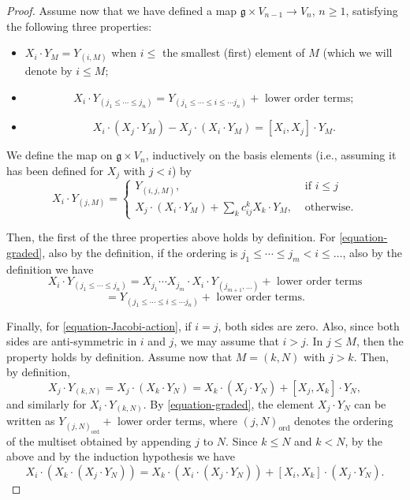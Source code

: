 \begin{proof}
Assume now that we have defined a map $\mathfrak g \times V_{n-1}\to V_n$, $n\ge 1$, satisfying the following three properties:
\begin{itemize}
 \item $X_i\cdot Y_M = Y_{(i,M)}$ when $i \le $ the smallest (first) element of $M$ (which we will denote by $i\le M$;
 \item 
\begin{equation}
\label{equation-graded} X_i\cdot Y_{(j_1\le \cdots \le j_n)} = Y_{(j_1\le \cdots\le i\le\cdots j_n)}+\mbox{ lower order terms};
 \end{equation}
\item 
\begin{equation}
\label{equation-Jacobi-action}
X_i\cdot(X_j\cdot Y_M) - X_j\cdot(X_i\cdot Y_M) = [X_i,X_j]\cdot Y_M.
\end{equation}
\end{itemize}
We define the map on $\mathfrak g \times V_n$, inductively on the basis elements (i.e., assuming it has been defined for $X_j$ with $j<i$) by
$$X_i \cdot Y_{(j,M)} = \begin{cases} Y_{(i,j, M)}, & \mbox{ if } i\le j\\ X_j\cdot(X_i\cdot Y_M) + \sum_k c_{ij}^k X_k\cdot Y_M, &\mbox{ otherwise.} \end{cases}$$

Then, the first of the three properties above holds by definition. For \eqref{equation-graded}, also by the definition, if the ordering is $j_1\le \cdots\le j_m < i\le \dots$, also by the definition we have
$$ X_i \cdot  Y_{(j_1\le \cdots \le j_n)} = X_{j_1}\cdots X_{j_m}\cdot X_i \cdot Y_{(j_{m+1},\dots)} + \mbox{ lower order terms}$$
$$ = Y_{(j_1\le \cdots\le i\le\cdots j_n)}+ \mbox{ lower order terms}.$$ 

Finally, for \eqref{equation-Jacobi-action},
if $i = j$, both sides are zero. Also, since both sides are anti-symmetric in $i$ and
$j$, we may assume that $i > j$. In $j\le M$, then the property holds by definition. Assume now that $M=(k,N)$ with $j>k$. Then, by definition,
$$ X_j \cdot Y_{(k,N)} = X_j\cdot(X_k\cdot Y_N) = X_k\cdot (X_j\cdot Y_N) + [X_j, X_k]\cdot Y_N,$$
and similarly for $X_i \cdot Y_{(k,N)}$. By \eqref{equation-graded}, the element $X_j\cdot Y_N$ can be written as $Y_{(j,N)_{\text{ord}}} + $ lower order terms, where $(j,N)_{\text{ord}}$ denotes the ordering of the multiset obtained by appending $j$ to $N$. Since $k\le N$ and $k<N$, by the above and by the induction hypothesis we have
$$ X_i\cdot (X_k\cdot (X_j\cdot Y_N)) =  X_k\cdot (X_i\cdot (X_j\cdot Y_N)) + [X_i,X_k]\cdot (X_j\cdot Y_N).$$


\end{proof}

